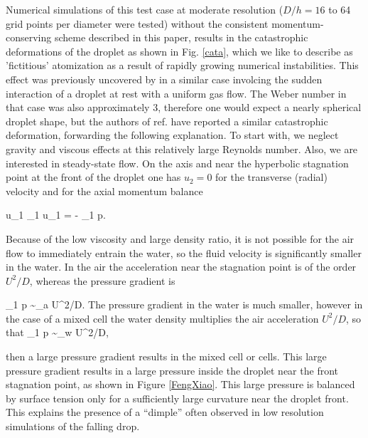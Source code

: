 Numerical simulations of this test case at moderate resolution ($D/h=16$ to 64 grid points per diameter were tested) without the consistent momentum-conserving scheme described in this paper, results in the catastrophic deformations of the droplet as shown in Fig. \ref{cata}, which we like to describe as 'fictitious' atomization as a result of rapidly growing numerical instabilities. This effect was previously uncovered by \cite{Xiao:2014vs} in a similar case involcing the sudden interaction of a droplet at rest with a uniform gas flow. The Weber number in that case was also approximately 3, therefore one would expect a nearly spherical droplet shape, but the authors of ref. \cite{Xiao:2014vs} have reported a similar catastrophic deformation, forwarding the following explanation. To start with, we neglect gravity and viscous effects at this relatively large Reynolds number. Also, we are interested in steady-state flow. On the axis and near the hyperbolic stagnation point at the front of the droplet one has $u_2=0$ for the transverse (radial) velocity and for the axial momentum balance

\be
u_1 \partial_1 u_1 = -  \rho \partial_1 p.
\nd

Because of the low viscosity and large density ratio, it is not possible for the air flow to immediately entrain the water, so the fluid velocity is significantly smaller in the water. In the air the acceleration near the stagnation point is of the order $U^2/D$, whereas the pressure gradient is

\be
\partial_1 p \sim \rho_{a} U^2/D.
\nd
The pressure gradient in the water is much smaller, however in the case of a mixed cell the water density multiplies the air acceleration $U^2/D$, so that
\be
\partial_1 p \sim \rho_{w} U^2/D,
\nd

then a large pressure gradient results in the mixed cell or cells. This large pressure gradient results in a large pressure inside the droplet near the front stagnation point, as shown in Figure \ref{FengXiao}. This large pressure is balanced by surface tension only for a sufficiently large curvature near the droplet front. This explains the presence of a ``dimple'' often observed in low resolution simulations of the falling drop. 

